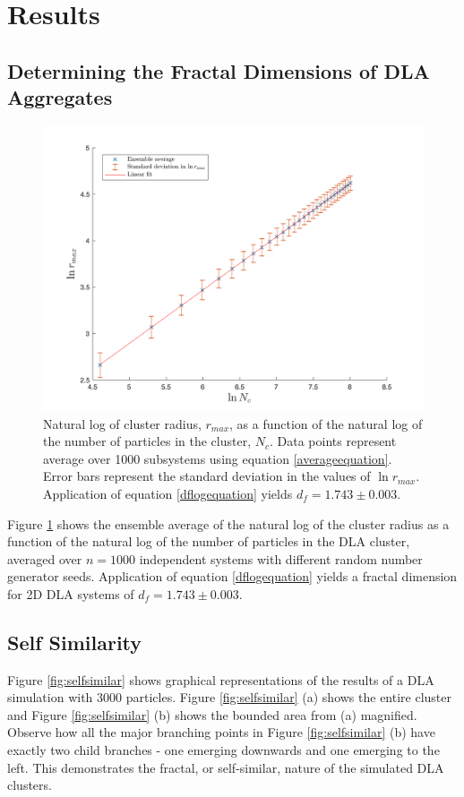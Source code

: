 \documentclass[11pt]{iopart}
\begin{document}
\section{Results}

\subsection{Determining the Fractal Dimensions of DLA Aggregates}

\begin{figure}[t]
  \centering
  \includegraphics[width=0.8\linewidth]{images/loggraph.png}
  \caption{Natural log of cluster radius, $r_{max}$, as a function of the natural log of the number of particles in the cluster, $N_c$. Data points represent average over 1000 subsystems using equation \ref{averageequation}. Error bars represent the standard deviation in the values of $\ln r_{max}$. Application of equation \ref{dflogequation} yields $d_f = 1.743  \pm 0.003$.}
  \label{fig:loggraph}
\end{figure}

Figure \ref{fig:loggraph} shows the ensemble average of the natural log of the cluster radius as a function of the natural log of the number of particles in the DLA cluster, averaged over $n=1000$ independent systems with different random number generator seeds. Application of equation \ref{dflogequation} yields a fractal dimension for 2D DLA systems of $d_f = 1.743 \pm 0.003$.

\subsection{Self Similarity}

Figure \ref{fig:selfsimilar} shows graphical representations of the results of a DLA simulation with 3000 particles. Figure \ref{fig:selfsimilar} (a) shows the entire cluster and Figure \ref{fig:selfsimilar} (b) shows the bounded area from (a) magnified. Observe how all the major branching points in Figure \ref{fig:selfsimilar} (b) have exactly two child branches - one emerging downwards and one emerging to the left. This demonstrates the fractal, or self-similar, nature of the simulated DLA clusters.
\end{document}
